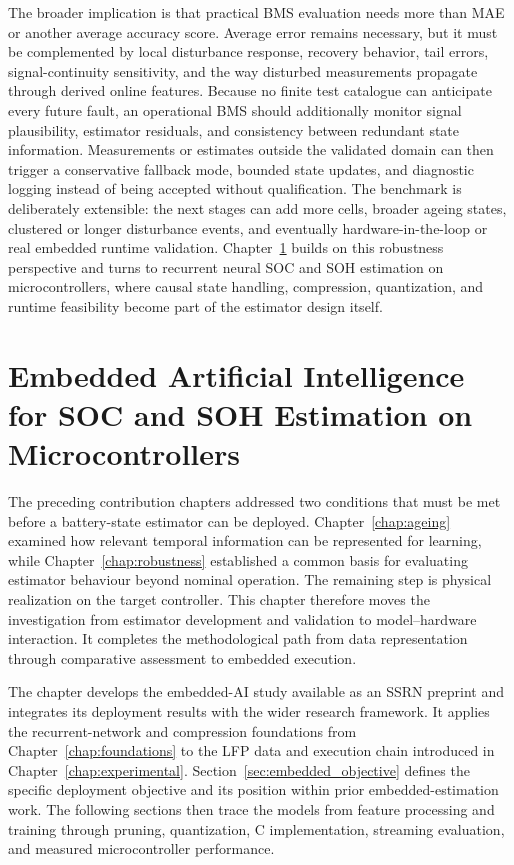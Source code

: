 \documentclass[
    a4paper,
    12pt,
    titlepage,
    bibliography=totoc,
    twoside=on,
    parskip=false,
    numbers=noenddot,
    cleardoublepage=empty,
    DIV=12,
    BCOR=12.0mm,
    headheight=36pt,
    headings=openright
]{scrreprt}
\begin{document}
The broader implication is that practical BMS evaluation needs more than MAE or another average accuracy score. Average error remains necessary, but it must be complemented by local disturbance response, recovery behavior, tail errors, signal-continuity sensitivity, and the way disturbed measurements propagate through derived online features. Because no finite test catalogue can anticipate every future fault, an operational BMS should additionally monitor signal plausibility, estimator residuals, and consistency between redundant state information. Measurements or estimates outside the validated domain can then trigger a conservative fallback mode, bounded state updates, and diagnostic logging instead of being accepted without qualification. The benchmark is deliberately extensible: the next stages can add more cells, broader ageing states, clustered or longer disturbance events, and eventually hardware-in-the-loop or real embedded runtime validation. Chapter~\ref{chap:embedded} builds on this robustness perspective and turns to recurrent neural SOC and SOH estimation on microcontrollers, where causal state handling, compression, quantization, and runtime feasibility become part of the estimator design itself.

\chapter{Embedded Artificial Intelligence for SOC and SOH Estimation on Microcontrollers}
\label{chap:embedded}
The preceding contribution chapters addressed two conditions that must be met before a battery-state estimator can be deployed. Chapter~\ref{chap:ageing} examined how relevant temporal information can be represented for learning, while Chapter~\ref{chap:robustness} established a common basis for evaluating estimator behaviour beyond nominal operation. The remaining step is physical realization on the target controller. This chapter therefore moves the investigation from estimator development and validation to model--hardware interaction. It completes the methodological path from data representation through comparative assessment to embedded execution.

The chapter develops the embedded-AI study available as an SSRN preprint and integrates its deployment results with the wider research framework.\autocite{rzepkaEmbeddedArtificialIntelligence2026} It applies the recurrent-network and compression foundations from Chapter~\ref{chap:foundations} to the LFP data and execution chain introduced in Chapter~\ref{chap:experimental}. Section~\ref{sec:embedded_objective} defines the specific deployment objective and its position within prior embedded-estimation work. The following sections then trace the models from feature processing and training through pruning, quantization, C implementation, streaming evaluation, and measured microcontroller performance.
\end{document}
